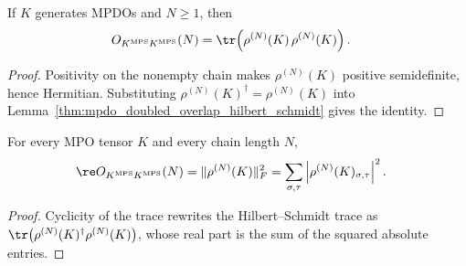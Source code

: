 \begin{corollary}
    \label{cor:mpdo_doubled_overlap_trace_sq}
    \leanok
    If $K$ generates MPDOs and $N\geq1$, then
    \begin{align}
        O_{K^{\mathrm{MPS}}K^{\mathrm{MPS}}}(N)
         & =\tr\!\left(\rho^{(N)}(K)\,\rho^{(N)}(K)\right).
        \notag
    \end{align}
\end{corollary}

\begin{proof}
    \leanok
    Positivity on the nonempty chain makes $\rho^{(N)}(K)$ positive
    semidefinite, hence Hermitian. Substituting
    $\rho^{(N)}(K)^\dagger=\rho^{(N)}(K)$ into
    Lemma~\ref{thm:mpdo_doubled_overlap_hilbert_schmidt} gives the
    identity.
\end{proof}

\begin{corollary}
    \label{cor:mpdo_doubled_overlap_frobenius}
    \leanok
    For every MPO tensor $K$ and every chain length $N$,
    \begin{align}
        \re O_{K^{\mathrm{MPS}}K^{\mathrm{MPS}}}(N)
         & =\|\rho^{(N)}(K)\|_F^2
        =\sum_{\sigma,\tau}
        \left|\rho^{(N)}(K)_{\sigma,\tau}\right|^2.
        \notag
    \end{align}
\end{corollary}

\begin{proof}
    \leanok
    Cyclicity of the trace rewrites the Hilbert--Schmidt trace as
    $\tr\!\left(\rho^{(N)}(K)^\dagger\rho^{(N)}(K)\right)$, whose real
    part is the sum of the squared absolute entries.
\end{proof}

